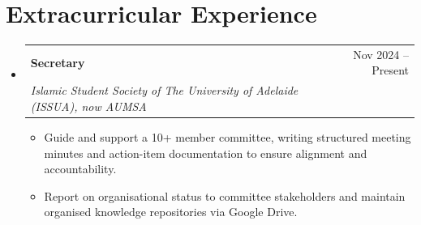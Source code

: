 \documentclass[letterpaper,11pt]{article}
\makeatletter
\newcommand{\resumeItem}[1]{
  \item\small{
    {#1 \vspace{-2pt}}
  }
}
\newcommand{\resumeSubheading}[4]{
  \vspace{0pt}\item
    \begin{tabular*}{0.97\textwidth}[t]{l@{\extracolsep{\fill}}r}
      \textbf{#1} & #2 \\
      \textit{\small#3} %
    \end{tabular*} %
    \textit{\small #4}
    \vspace{-7pt}
}
\newcommand{\resumeSubHeadingListStart}{\begin{itemize}[leftmargin=0.10in, label={}]}
\newcommand{\resumeSubHeadingListEnd}{\end{itemize}}
\newcommand{\resumeItemListStart}{\begin{itemize}[leftmargin=0.14in]}
\newcommand{\resumeItemListEnd}{\end{itemize}\vspace{-8pt}}
\makeatother
\begin{document}
\section{Extracurricular Experience}
   \resumeSubHeadingListStart
    \resumeSubheading
    {Secretary}{\small Nov 2024 -- Present}
    {Islamic Student Society of The University of Adelaide (ISSUA), now AUMSA}{}
    \resumeItemListStart
    \resumeItem{Guide and support a 10+ member committee, writing structured meeting minutes and action-item documentation to ensure alignment and accountability.}
    \resumeItem{Report on organisational status to committee stakeholders and maintain organised knowledge repositories via Google Drive.}
    \resumeItemListEnd
       \resumeSubHeadingListEnd

\end{document}
